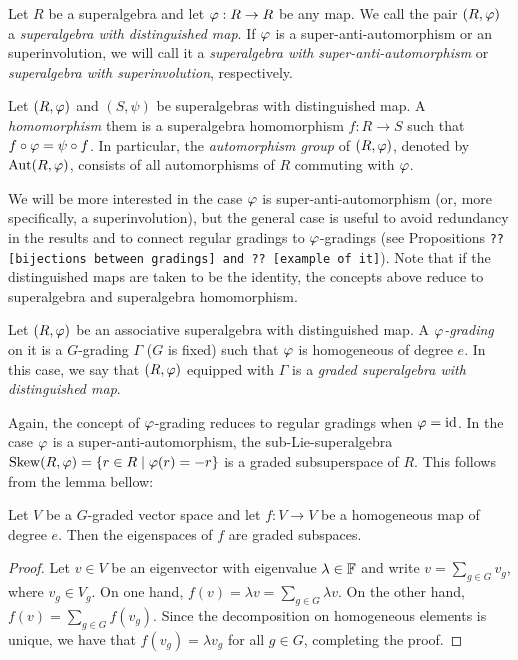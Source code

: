 \documentclass{amsbook}
\begin{document}
\begin{defi}
    Let $R$ be a superalgebra and let $\varphi: R\to R$ be any map. We call the pair $(R, \varphi)$ a \emph{superalgebra with distinguished map}. If $\varphi$ is a super-anti-automorphism or an superinvolution, we will call it a \emph{superalgebra with super-anti-automorphism} or \emph{superalgebra with superinvolution}, respectively.
\end{defi}

\begin{defi}
    Let $(R, \varphi)$ and $(S, \psi)$ be superalgebras with distinguished map. A \emph{homomorphism} them is a superalgebra homomorphism $f: R\to S$ such that $f\circ \varphi = \psi \circ f$. In particular, the \emph{automorphism group} of $(R, \varphi)$, denoted by $\operatorname{Aut}(R, \varphi)$, consists of all automorphisms of $R$ commuting with $\varphi$.
\end{defi}

We will be more interested in the case $\varphi$ is super-anti-automorphism (or, more specifically, a superinvolution), but the general case is useful to avoid redundancy in the results and to connect regular gradings to $\varphi$-gradings (see Propositions \texttt{?? [bijections between gradings]  and ?? [example of it]}). Note that if the distinguished maps are taken to be the identity, the concepts above reduce to superalgebra and superalgebra homomorphism. 

\begin{defi}
    Let $(R, \varphi)$ be an associative superalgebra with distinguished map. A \emph{$\varphi$-grading} on it is a $G$-grading $\Gamma$ ($G$ is fixed) such that $\varphi$ is homogeneous of degree $e$. In this case, we say that $(R, \varphi)$ equipped with $\Gamma$ is a \emph{graded superalgebra with distinguished map}.
\end{defi}

Again, the concept of $\varphi$-grading reduces to regular gradings when $\varphi = \operatorname{id}$. In the case $\varphi$ is a super-anti-automorphism, the sub-Lie-superalgebra $\operatorname{Skew} (R, \varphi) = \{ r\in R \mid \varphi(r) = -r \}$ is a graded subsuperspace of $R$. This follows from the lemma bellow:

\begin{lemma}
    Let $V$ be a $G$-graded vector space and let $f: V \to V$ be a homogeneous map of degree $e$. Then the eigenspaces of $f$ are graded subspaces.
\end{lemma}

\begin{proof}
    Let $v\in V$ be an eigenvector with eigenvalue $\lambda \in \mathbb{F}$ and write $v = \sum_{g\in G} v_g$, where $v_g \in V_g$. On one hand, $f(v) = \lambda v = \sum_{g\in G} \lambda v$. On the other hand, $f(v) = \sum_{g\in G} f(v_g)$. Since the decomposition on homogeneous elements is unique, we have that $f(v_g) = \lambda v_g$ for all $g\in G$, completing the proof.
\end{proof}
\end{document}
